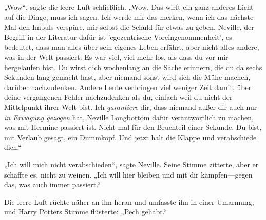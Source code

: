 „Wow“, sagte die leere Luft schließlich. „Wow. Das wirft ein ganz anderes Licht auf die Dinge, muss ich sagen. Ich werde mir das merken, wenn ich das nächste Mal den Impuls verspüre, mir selbst die Schuld für etwas zu geben. Neville, der Begriff in der Literatur dafür ist 'egozentrische Voreingenommenheit', es bedeutet, dass man alles über sein eigenes Leben erfährt, aber nicht alles andere, was in der Welt passiert. Es war viel, viel mehr los, als dass du vor mir hergelaufen bist. Du wirst dich wochenlang an die Sache erinnern, die du da sechs Sekunden lang gemacht hast, aber niemand sonst wird sich die Mühe machen, darüber nachzudenken. Andere Leute verbringen viel weniger Zeit damit, über deine vergangenen Fehler nachzudenken als du, einfach weil du nicht der Mittelpunkt ihrer Welt bist. Ich \emph{garantiere} dir, dass niemand außer dir auch nur \emph{in Erwägung gezogen} hat, Neville Longbottom dafür verantwortlich zu machen, was mit Hermine passiert ist. Nicht mal für den Bruchteil einer Sekunde. Du bist, mit Verlaub gesagt, ein Dummkopf. Und jetzt halt die Klappe und verabschiede dich.“

„Ich will mich nicht verabschieden“, sagte Neville. Seine Stimme zitterte, aber er schaffte es, nicht zu weinen. „Ich will hier bleiben und mit dir kämpfen—gegen das, was auch immer passiert.“

Die leere Luft rückte näher an ihn heran und umfasste ihn in einer Umarmung, und Harry Potters Stimme flüsterte: „Pech gehabt.“

